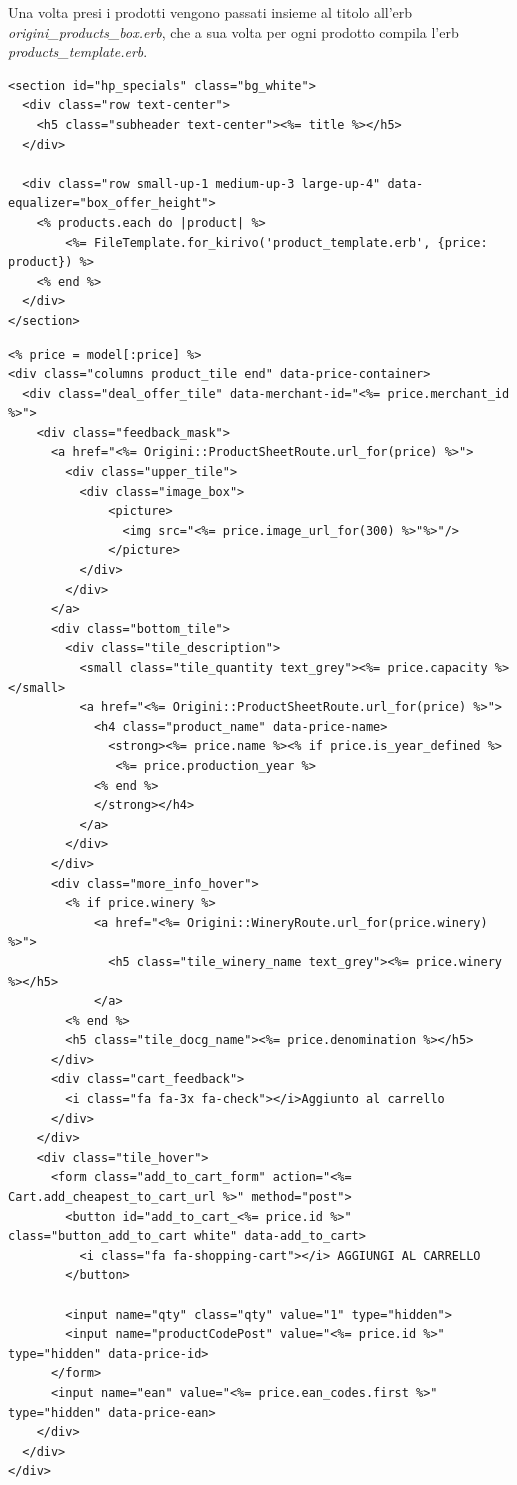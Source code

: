 Una volta presi i prodotti vengono passati insieme al titolo all'erb \emph{origini\_products\_box.erb}, che a sua volta per ogni prodotto
compila l'erb \emph{products\_template.erb}.
\newpage
\begin{lstlisting}[basicstyle=\tiny,caption={Il template \emph{origini\_products\_box.erb}}] 
<section id="hp_specials" class="bg_white">
  <div class="row text-center">
    <h5 class="subheader text-center"><%= title %></h5>
  </div>

  <div class="row small-up-1 medium-up-3 large-up-4" data-equalizer="box_offer_height">
    <% products.each do |product| %>
        <%= FileTemplate.for_kirivo('product_template.erb', {price: product}) %>
    <% end %>
  </div>
</section>
\end{lstlisting}
\begin{lstlisting}[basicstyle=\tiny, caption={Il template \emph{products\_template.erb}}] 
<% price = model[:price] %>
<div class="columns product_tile end" data-price-container>
  <div class="deal_offer_tile" data-merchant-id="<%= price.merchant_id %>">
    <div class="feedback_mask">
      <a href="<%= Origini::ProductSheetRoute.url_for(price) %>">
        <div class="upper_tile">
          <div class="image_box">
              <picture>
                <img src="<%= price.image_url_for(300) %>"%>"/>
              </picture>
          </div>
        </div>
      </a>
      <div class="bottom_tile">
        <div class="tile_description">
          <small class="tile_quantity text_grey"><%= price.capacity %></small>
          <a href="<%= Origini::ProductSheetRoute.url_for(price) %>">
            <h4 class="product_name" data-price-name>
              <strong><%= price.name %><% if price.is_year_defined %>
               <%= price.production_year %>
            <% end %>
            </strong></h4>
          </a>
        </div>
      </div>
      <div class="more_info_hover">
        <% if price.winery %>
            <a href="<%= Origini::WineryRoute.url_for(price.winery) %>">
              <h5 class="tile_winery_name text_grey"><%= price.winery %></h5>
            </a>
        <% end %>
        <h5 class="tile_docg_name"><%= price.denomination %></h5>
      </div>
      <div class="cart_feedback">
        <i class="fa fa-3x fa-check"></i>Aggiunto al carrello
      </div>
    </div>
    <div class="tile_hover">
      <form class="add_to_cart_form" action="<%= Cart.add_cheapest_to_cart_url %>" method="post">
        <button id="add_to_cart_<%= price.id %>" class="button_add_to_cart white" data-add_to_cart>
          <i class="fa fa-shopping-cart"></i> AGGIUNGI AL CARRELLO
        </button>

        <input name="qty" class="qty" value="1" type="hidden">
        <input name="productCodePost" value="<%= price.id %>" type="hidden" data-price-id>
      </form>
      <input name="ean" value="<%= price.ean_codes.first %>" type="hidden" data-price-ean>
    </div>
  </div>
</div>
\end{lstlisting}


